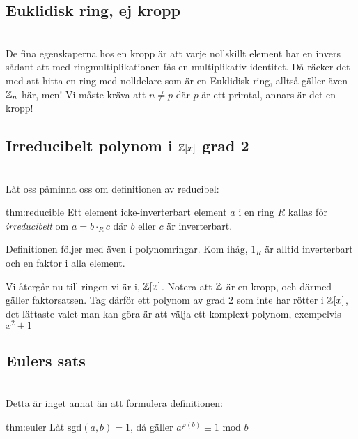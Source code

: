 \subsection{Euklidisk ring, ej kropp}\hfill\\

\noindent De fina egenskaperna hos en kropp är att varje nollskillt element har en invers sådant att med ringmultiplikationen fås en multiplikativ identitet. Då räcker det med att hitta en ring med nolldelare som är en Euklidisk ring, alltså gäller även $\mathbb{Z}_n$ här, men! Vi måste kräva att $n\neq p$ där $p$ är ett primtal, annars är det en kropp! 
\par\bigskip

\subsection{Irreducibelt polynom i $\mathbb{Z}[x]$ grad 2}\hfill\\

\noindent Låt oss påminna oss om definitionen av reducibel:
\par\bigskip
\begin{theo}{thm:reducible}
  \noindent Ett element icke-inverterbart element $a$ i en ring $R$ kallas för \textit{irreducibelt} om $a = b\cdot_R c$ där $b$ eller $c$ är inverterbart.
\end{theo}
\par\bigskip
\noindent Definitionen följer med även i polynomringar. Kom ihåg, $1_R$ är alltid inverterbart och en faktor i alla element.
\par\bigskip
\noindent Vi återgår nu till ringen vi är i, $\mathbb{Z}[x]$. Notera att $\mathbb{Z}$ är en kropp, och därmed gäller faktorsatsen. Tag därför ett polynom av grad 2 som inte har rötter i $\mathbb{Z}[x]$, det lättaste valet man kan göra är att välja ett komplext polynom, exempelvis $x^2+1$

\newpage

\subsection{Eulers sats}\hfill\\

\noindent Detta är inget annat än att formulera definitionen:
\par\bigskip
\begin{theo}{thm:euler}
  \noindent Låt $\text{sgd}(a,b) = 1$, då gäller $a^{\varphi(b)}\equiv 1 \text{ mod }b$
\end{theo}
\par\bigskip

